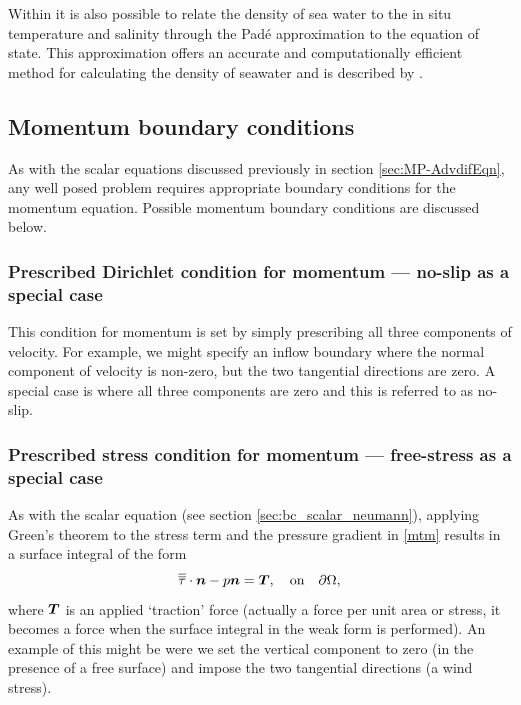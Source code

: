Within \fluidity it is also possible to relate the density of sea water to the in situ temperature and salinity through the Pad{\'e} approximation to the equation of state. This approximation offers an accurate and computationally efficient method for calculating the density of seawater and is described by \citet{mcdougall2003}.


\subsection{Momentum boundary conditions} \label{sec:BCs-mom}


As with the scalar equations discussed previously in section \ref{sec:MP-AdvdifEqn}, any well posed problem requires appropriate boundary conditions for the momentum equation. Possible momentum boundary conditions are discussed below.

\subsubsection{Prescribed Dirichlet condition for momentum --- no-slip as a special case}\label{sec:bc_vector_dirichlet}

This condition for momentum is set by simply prescribing all three components of
velocity. For example, we might specify an inflow boundary where the normal component
of velocity is non-zero, but the two tangential directions are zero. A special case is
where all three components are zero and this is referred to as no-slip.

\subsubsection{Prescribed stress condition for momentum --- free-stress as a special case}\label{sec:bc_vector_stress}

As with the scalar equation (see section \ref{sec:bc_scalar_neumann}), applying Green's theorem to the stress term and the pressure
gradient in \eqref{mtm} results in a surface integral of the form
\begin{equation}\label{StressBC}
\overline{\overline{\tau}}\cdot{\mbox{\boldmath$n$}} - p{\mbox{\boldmath$n$}} = {\mbox{\boldmath$T$}},\quad \textrm{on}\quad \partial\Omega,
\end{equation}
where ${\mbox{\boldmath$T$}}$ is an applied `traction' force (actually a force per unit area or stress, it becomes
a force when the surface integral in the weak form is performed). An example of this might be were we set the vertical
component to zero (in the presence of a free surface) and impose the two tangential directions
(\eg a wind stress).

